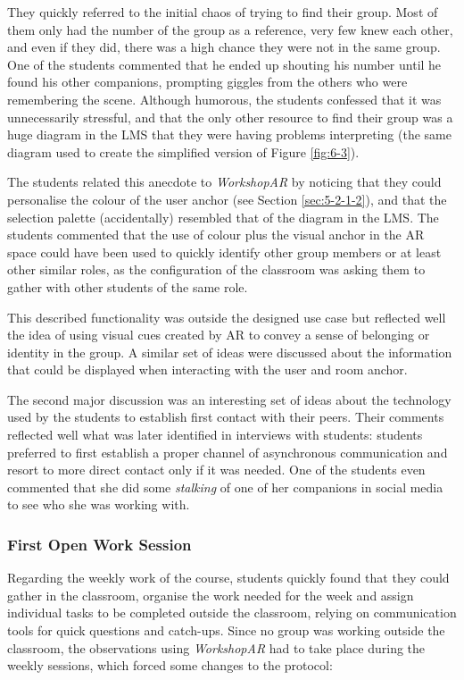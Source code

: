 They quickly referred to the initial chaos of trying to find their group. Most of them only had the number of the group as a reference, very few knew each other, and even
if they did, there was a high chance they were not in the same group. One of the students commented that he ended up shouting his number until he found his other companions,
prompting giggles from the others who were remembering the scene. Although humorous, the students confessed that it was unnecessarily stressful, and that the only other
resource to find their group was a huge diagram in the \ac{LMS} that they were having problems interpreting (the same diagram used to create the simplified version of
Figure \ref{fig:6-3}).

The students related this anecdote to \emph{WorkshopAR} by noticing that they could personalise the colour of the user anchor (see Section \ref{sec:5-2-1-2}), and that the
selection palette (accidentally) resembled that of the diagram in the \ac{LMS}. The students commented that the use of colour plus the visual anchor in the \ac{AR} space
could have been used to quickly identify other group members or at least other similar roles, as the configuration of the classroom was asking them to gather with other
students of the same role.

This described functionality was outside the designed use case but reflected well the idea of using visual cues created by \ac{AR} to convey a sense of belonging or
identity in the group. A similar set of ideas were discussed about the information that could be displayed when interacting with the user and room anchor.

The second major discussion was an interesting set of ideas about the technology used by the students to establish first contact with their peers. Their comments reflected
well what was later identified in interviews with students: students preferred to first establish a proper channel of asynchronous communication and resort to more direct
contact only if it was needed. One of the students even commented that she did some \emph{stalking} of one of her companions in social media to see who she was working with.

\subsubsection{First Open Work Session \label{sec:6-4-2-2}}

Regarding the weekly work of the course, students quickly found that they could gather in the classroom, organise the work needed for the week and assign individual tasks to
be completed outside the classroom, relying on communication tools for quick questions and catch-ups. Since no group was working outside the classroom, the observations using
\emph{WorkshopAR} had to take place during the weekly sessions, which forced some changes to the protocol:

